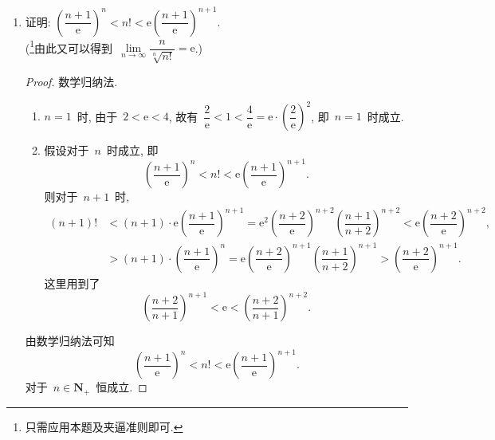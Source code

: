 \documentclass[UTF8,a4paper,11pt,twoside]{book}
\newcommand{\e}{\mathrm e}
\begin{document}
\begin{enumerate}
	\item 证明: $\left(\dfrac{n+1}{\e}\right)^n<n!<\e\left(\dfrac{n+1}{\e}\right)^{n+1}$.\\
	      (\footnote{只需应用本题及夹逼准则即可.}由此又可以得到~$\lim\limits_{n\to\infty} \dfrac{n}{\sqrt[n]{n!}}=\e$.)
	      \begin{proof}
		      数学归纳法.
		      \begin{enumerate}[(1)]
			      \item $n=1$~时, 由于~$2<\e<4$, 故有~$\dfrac{2}{\e}<1<\dfrac{4}{\e}=\e\cdot\left(\dfrac{2}{\e}\right)^2$, 即~$n=1$~时成立.
			      \item 假设对于~$n$~时成立, 即
			            \[
				            \left(\dfrac{n+1}{\e}\right)^n<n!<\e\left(\dfrac{n+1}{\e}\right)^{n+1}.
			            \]
			            则对于~$n+1$~时,
			            \[
				            \begin{split}
					            (n+1)!&<(n+1)\cdot\e\left(\dfrac{n+1}{\e}\right)^{n+1}
					            =\e^2\left(\dfrac{n+2}{\e}\right)^{n+2}\left(\dfrac{n+1}{n+2}\right)^{n+2}<\e\left(\dfrac{n+2}{\e}\right)^{n+2},\\
					            &>(n+1)\cdot\left(\dfrac{n+1}{\e}\right)^{n}
					            =\e\left(\dfrac{n+2}{\e}\right)^{n+1}\left(\dfrac{n+1}{n+2}\right)^{n+1}>\left(\dfrac{n+2}{\e}\right)^{n+1}.
				            \end{split}
			            \]
			            这里用到了
			            \[
				            \left(\dfrac{n+2}{n+1}\right)^{n+1}<\e<\left(\dfrac{n+2}{n+1}\right)^{n+2}.
			            \]
		      \end{enumerate}
		      由数学归纳法可知
		      \[
			      \left(\dfrac{n+1}{\e}\right)^n<n!<\e\left(\dfrac{n+1}{\e}\right)^{n+1}.
		      \]
		      对于~$n\in\mathbf{N}_{+}$~恒成立.\qedhere
	      \end{proof}


\end{enumerate}
\end{document}
